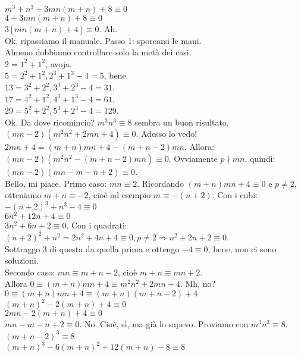 \begin{sol}
  $m^3+n^3+3mn(m+n)+8 \equiv 0$ \\
  $4+3mn(m+n)+8 \equiv 0$ \\
  $3[mn(m+n)+4] \equiv 0$. Ah. \\
  Ok, ripassiamo il manuale. Passo 1: sporcarsi le mani. \\
  Almeno dobbiamo controllare solo la metà dei casi. \\
  $2=1^2+1^2$, avoja. \\
  $5=2^2+1^2, 2^3+1^3-4=5$, bene. \\
  $13=3^2+2^2, 3^3+2^3-4=31$. \\
  $17=4^2+1^2, 4^3+1^3-4=61$. \\
  $29=5^2+2^2, 5^3+2^3-4=129$. \\
  Ok. Da dove ricomincio? $m^3n^3 \equiv 8$ sembra un buon risultato. \\
  $(mn-2)(m^2n^2+2mn+4) \equiv 0$. Adesso lo vedo! \\
  $2mn+4=(m+n)mn+4-(m+n-2)mn$. Allora: \\
  $(mn-2)(m^2n^2-(m+n-2)mn) \equiv 0$. Ovviamente $p \nmid mn$, quindi: \\
  $(mn-2)(mn-m-n+2) \equiv 0$. \\
  Bello, mi piace. Primo caso: $mn \equiv 2$. Ricordando $(m+n)mn+4 \equiv 0$ e $p \not =2$, otteniamo $m+n \equiv -2$, cioè ad esempio $m \equiv -(n+2)$. Con i cubi:
  $-(n+2)^3+n^3-4 \equiv 0$ \\
  $6n^2+12n+4 \equiv 0$ \\
  $3n^2+6n+2 \equiv 0$. Con i quadrati: \\
  $(n+2)^2+n^2=2n^2+4n+4 \equiv 0, p \not =2 \Rightarrow n^2+2n+2 \equiv 0$. \\
  Sottraggo 3 di questa da quella prima e ottengo $-4 \equiv 0$, bene, non ci sono soluzioni. \\
  Secondo caso: $mn \equiv m+n-2$, cioè $m+n \equiv mn+2$. \\
  Allora $0 \equiv (m+n)mn+4 \equiv m^2n^2+2mn+4$. Mh, no? \\
  $0 \equiv (m+n)mn+4 \equiv (m+n)(m+n-2)+4$ \\
  $(m+n)^2-2(m+n)+4 \equiv 0$ \\
  $2mn-2(m+n)+4 \equiv 0$ \\
  $mn-m-n+2 \equiv 0$. No. Cioè, sì, ma già lo sapevo. Proviamo con $m^3n^3 \equiv 8$. \\
  $(m+n-2)^3 \equiv 8$ \\
  $(m+n)^3-6(m+n)^2+12(m+n)-8 \equiv 8$ \\

\end{sol}
